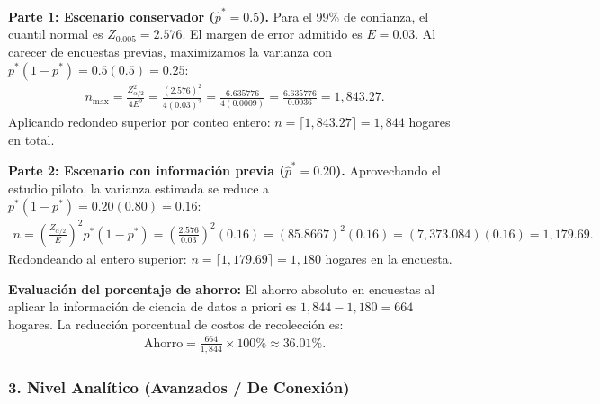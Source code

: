 \begin{solproblema}
	\textbf{Parte 1: Escenario conservador ($\hat{p}^* = 0.5$).}
	Para el 99\% de confianza, el cuantil normal es $Z_{0.005} = 2.576$. El margen de error admitido es $E = 0.03$. Al carecer de encuestas previas, maximizamos la varianza con $p^*(1-p^*) = 0.5(0.5) = 0.25$:
	\begin{align}
		n_{\text{max}} = \frac{Z_{\alpha/2}^2}{4 E^2} = \frac{(2.576)^2}{4 (0.03)^2} = \frac{6.635776}{4 (0.0009)} = \frac{6.635776}{0.0036} = 1,843.27.
	\end{align}
	Aplicando redondeo superior por conteo entero: $n = \lceil 1,843.27 \rceil = 1,844$ hogares en total.
	
	\textbf{Parte 2: Escenario con información previa ($\hat{p}^* = 0.20$).}
	Aprovechando el estudio piloto, la varianza estimada se reduce a $p^*(1-p^*) = 0.20(0.80) = 0.16$:
	\begin{align}
		n = \left( \frac{Z_{\alpha/2}}{E} \right)^2 p^*(1-p^*) = \left( \frac{2.576}{0.03} \right)^2 (0.16) = (85.8667)^2 (0.16) = (7,373.084)(0.16) = 1,179.69.
	\end{align}
	Redondeando al entero superior: $n = \lceil 1,179.69 \rceil = 1,180$ hogares en la encuesta.
	
	\textbf{Evaluación del porcentaje de ahorro:}
	El ahorro absoluto en encuestas al aplicar la información de ciencia de datos a priori es $1,844 - 1,180 = 664$ hogares. La reducción porcentual de costos de recolección es:
	\begin{align}
		\text{Ahorro} = \frac{664}{1,844} \times 100\% \approx 36.01\%.
	\end{align}
\end{solproblema}

\subsubsection*{3. Nivel Analítico (Avanzados / De Conexión)}

